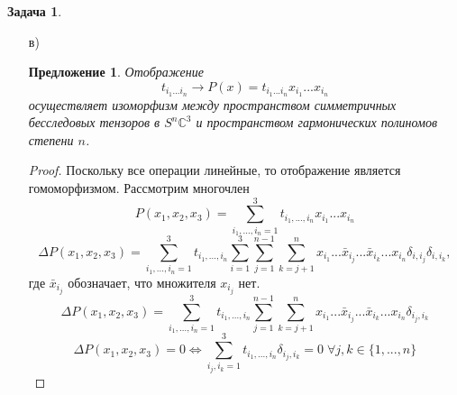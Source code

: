 \documentclass[12pt]{article}
\newtheorem{predl}[theorem]{Предложение}
\newtheorem{sled}[theorem]{Следствие}
\theoremstyle{definition}
\newtheorem{zad}{Задача}[section]
\begin{document}
\begin{zad}
\begin{itemize}
\begin{proof}
\begin{equation}
        \end{equation}
        Таким образом, оператор Лапласа $\Delta$ является инвариантным относительно действия группы $SO(3)$.
    \end{proof}
    \begin{sled}
    Пространства $H_n$ являются инвариантными подпространствами относительно группы $SO(3)$.
    \end{sled}
    \begin{proof}
        Пусть $P(x_1,x_2,x_3)\in H_n$, тогда $\Delta P=0$. По предложению 33: $\Delta' P=\Delta P=0$, значит $P(x'_1,x'_2,x'_3)\in H_n$ и пространства $H_n$ являются инвариантными подпространствами относительно группы $SO(3)$.
    \end{proof}
    \item[в)]
    \begin{predl}
    Отображение
    \begin{equation}
        t_{i_1...i_n}\rightarrow P(x)=t_{i_1...i_n}x_{i_1}...x_{i_n}
    \end{equation}
    осуществляет изоморфизм между пространством симметричных бесследовых тензоров в $S^n\mathbb{C}^3$ и пространством гармонических полиномов степени $n$.
    \end{predl}
    \begin{proof}
        Поскольку все операции линейные, то отображение является гомоморфизмом. Рассмотрим многочлен
        \begin{equation}
            P(x_1,x_2,x_3)=\sum\limits_{i_1,...,i_n=1}^3t_{i_1,...,i_n}x_{i_1}...x_{i_n}
        \end{equation}
        \begin{equation}
            \Delta P(x_1,x_2,x_3)=\sum\limits_{i_1,...,i_n=1}^3t_{i_1,...,i_n}\sum\limits_{i=1}^3\sum_{j=1}^{n-1}\sum_{k=j+1}^nx_{i_1}...\bar{x}_{i_j}...\bar{x}_{i_k}...x_{i_n}\delta_{i,i_j}\delta_{i,i_k},
        \end{equation}
        где $\bar{x}_{i_j}$ обозначает, что множителя $x_{i_j}$ нет.
        \begin{equation}
            \Delta P(x_1,x_2,x_3)=\sum\limits_{i_1,...,i_n=1}^3t_{i_1,...,i_n}\sum_{j=1}^{n-1}\sum_{k=j+1}^nx_{i_1}...\bar{x}_{i_j}...\bar{x}_{i_k}...x_{i_n}\delta_{i_j,i_k}
        \end{equation}
        \begin{equation}
        \Delta P(x_1,x_2,x_3)=0\Leftrightarrow \sum\limits_{i_j,i_k=1}^3t_{i_1,...,i_n}\delta_{i_j,i_k}=0\;\forall j,k\in\{1,...,n\}
        \end{equation}

\end{proof}
\end{itemize}
\end{zad}
\end{document}
